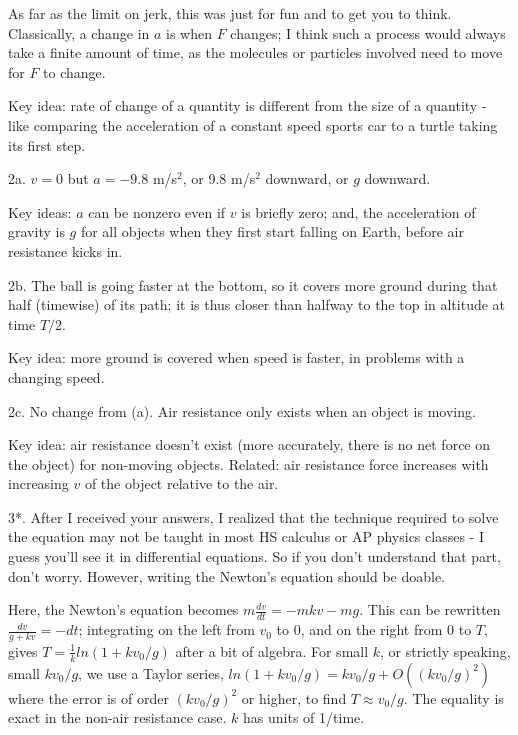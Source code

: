 \documentclass[12pt]{article}
\begin{document}
As far as the limit on jerk, this was just for fun and to get you to think. Classically, a change in $a$ is when $F$ changes; I think such a process would always take a finite amount of time, as the molecules or particles involved need to move for $F$ to change.

Key idea: rate of change of a quantity is different from the size of a quantity - like comparing the acceleration of a constant speed sports car to a turtle taking its first step.

2a. $v=0$ but $a=-9.8$ m/s$^2$, or 9.8 m/s$^2$ downward, or $g$ downward. 

Key ideas: $a$ can be nonzero even if $v$ is briefly zero; and, the acceleration of gravity is $g$ for all objects when they first start falling on Earth, before air resistance kicks in.

2b. The ball is going faster at the bottom, so it covers more ground during that half (timewise) of its path; it is thus closer than halfway to the top in altitude at time $T/2$.

Key idea: more ground is covered when speed is faster, in problems with a changing speed.

2c. No change from (a). Air resistance only exists when an object is moving. 

Key idea: air resistance doesn't exist (more accurately, there is no net force on the object) for non-moving objects. Related: air resistance force increases with increasing $v$ of the object relative to the air.

3*. After I received your answers, I realized that the technique required to solve the equation may not be taught in most HS calculus or AP physics classes - I guess you'll see it in differential equations. So if you don't understand that part, don't worry. However, writing the Newton's equation should be doable.

Here, the Newton's equation becomes $m\frac{dv}{dt}=-mkv-mg$. This can be rewritten $\frac{dv}{g+kv}=-dt$; integrating on the left from $v_0$ to 0, and on the right from 0 to $T$, gives $T=\frac{1}{k}ln(1+kv_0/g)$ after a bit of algebra. For small $k$, or strictly speaking, small $kv_0/g$, we use a Taylor series, $ln(1+kv_0/g) = kv_0/g + O((kv_0/g)^2)$ where the error is of order $(kv_0/g)^2$ or higher, to find $T \approx v_0/g$. The equality is exact in the non-air resistance case. $k$ has units of 1/time.
\end{document}
